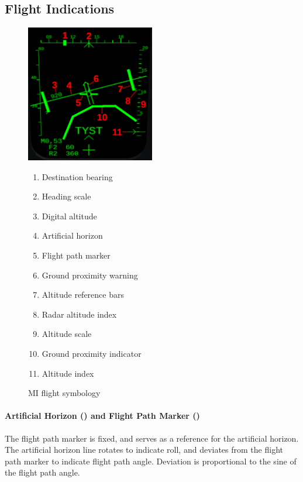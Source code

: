 \subsection{Flight Indications}
\begin{figure}[!ht]
  \centering
  \includegraphics[width=0.5\textwidth]{images/displays/MI-flight.png}

  \begin{multicols}{2}
    \begin{enumerate}[nosep]
      \item \label{item:heading-bug} Destination bearing
      \item \label{item:heading-mi} Heading scale
      \item \label{item:dig-alt} Digital altitude
      \item \label{item:horizon-mi} Artificial horizon
      \item \label{item:fpv-mi} Flight path marker
      \item \label{item:gpw-arrow} Ground proximity warning
      \item \label{item:alt-bars} Altitude reference bars
      \item \label{item:rhm-index} Radar altitude index
      \item \label{item:alt-scale} Altitude scale
      \item \label{item:ground} Ground proximity indicator
      \item \label{item:alt-index} Altitude index
    \end{enumerate}
  \end{multicols}

  \caption{MI flight symbology}
  \label{fig:mi-flight}
\end{figure}

\paragraph{%
  Artificial Horizon ()
  and Flight Path Marker ()
}
The flight path marker is fixed, and serves as a reference for the artificial horizon.
The artificial horizon line rotates to indicate roll,
and deviates from the flight path marker to indicate flight path angle.
Deviation is proportional to the sine of the flight path angle.

